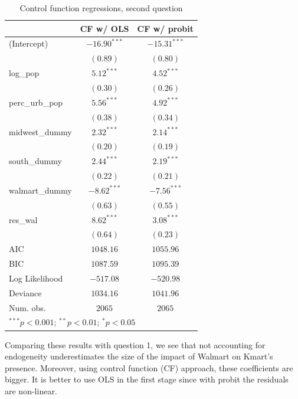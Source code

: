 \documentclass{article}
\theoremstyle{definition}
\begin{document}
\begin{table}[h]
\begin{center}
\begin{tabular}{l c c}
\hline
 & CF w/ OLS & CF w/ probit \\
\hline
(Intercept)       & $-16.90^{***}$ & $-15.31^{***}$ \\
                  & $(0.89)$       & $(0.80)$       \\
log\_pop          & $5.12^{***}$   & $4.52^{***}$   \\
                  & $(0.30)$       & $(0.26)$       \\
perc\_urb\_pop    & $5.56^{***}$   & $4.92^{***}$   \\
                  & $(0.38)$       & $(0.34)$       \\
midwest\_dummy    & $2.32^{***}$   & $2.14^{***}$   \\
                  & $(0.20)$       & $(0.19)$       \\
south\_dummy      & $2.44^{***}$   & $2.19^{***}$   \\
                  & $(0.22)$       & $(0.21)$       \\
walmart\_dummy   & $-8.62^{***}$  & $-7.56^{***}$  \\
                  & $(0.63)$       & $(0.55)$       \\
res\_wal         & $8.62^{***}$   & $3.08^{***}$   \\
                  & $(0.64)$       & $(0.23)$       \\
\hline
AIC               & $1048.16$      & $1055.96$      \\
BIC               & $1087.59$      & $1095.39$      \\
Log Likelihood    & $-517.08$      & $-520.98$      \\
Deviance          & $1034.16$      & $1041.96$      \\
Num. obs.         & $2065$         & $2065$         \\
\hline
\multicolumn{3}{l}{\scriptsize{$^{***}p<0.001$; $^{**}p<0.01$; $^{*}p<0.05$}}
\end{tabular}
\caption{Control function regressions,  second question}
\label{tab:1}
\end{center}
\end{table}

Comparing these results with question 1, we see that not accounting for endogeneity underestimates the size of the impact of Walmart on Kmart's presence. Moreover, using control function (CF) approach, these coefficients are bigger. It is better to use OLS in the first stage since with probit the residuals are non-linear.  
\end{document}
